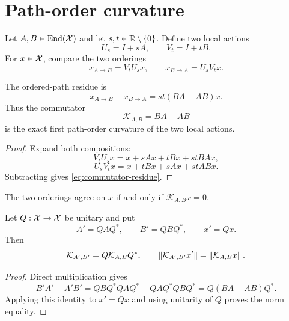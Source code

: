 \section{Path-order curvature}

Let $A,B\in\operatorname{End}(\mathcal X)$ and let $s,t\in\mathbb R\setminus\{0\}$. Define two local actions
\begin{equation}
U_s=I+sA,\qquad V_t=I+tB.
\label{eq:actions}
\end{equation}
For $x\in\mathcal X$, compare the two orderings
\begin{equation}
x_{A\to B}=V_tU_sx,\qquad
x_{B\to A}=U_sV_tx.
\label{eq:orders}
\end{equation}

\begin{theorem}
The ordered-path residue is
\begin{equation}
x_{A\to B}-x_{B\to A}=st(BA-AB)x.
\label{eq:commutator-residue}
\end{equation}
Thus the commutator
\begin{equation}
\mathcal K_{A,B}=BA-AB
\label{eq:curvature}
\end{equation}
is the exact first path-order curvature of the two local actions.
\end{theorem}

\begin{proof}
Expand both compositions:
\[
V_tU_sx=x+sAx+tBx+stBAx,
\]
\[
U_sV_tx=x+tBx+sAx+stABx.
\]
Subtracting gives \cref{eq:commutator-residue}.
\end{proof}

\begin{corollary}
The two orderings agree on $x$ if and only if $\mathcal K_{A,B}x=0$.
\end{corollary}

\begin{proposition}
Let $Q:\mathcal X\to\mathcal X$ be unitary and put
\[
A'=QAQ^*,\qquad B'=QBQ^*,\qquad x'=Qx.
\]
Then
\begin{equation}
\mathcal K_{A',B'}=Q\mathcal K_{A,B}Q^*,
\qquad
\left\lVert\mathcal K_{A',B'}x'\right\rVert=\left\lVert\mathcal K_{A,B}x\right\rVert.
\label{eq:curvature-unitary}
\end{equation}
\end{proposition}

\begin{proof}
Direct multiplication gives
\[
B'A'-A'B'
=QBQ^*QAQ^*-QAQ^*QBQ^*
=Q(BA-AB)Q^*.
\]
Applying this identity to $x'=Qx$ and using unitarity of $Q$ proves the norm equality.
\end{proof}


